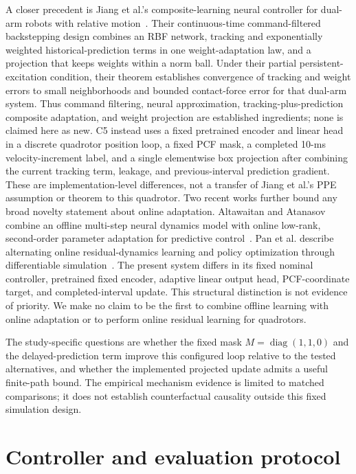 \documentclass[11pt]{article}
\begin{document}
A closer precedent is Jiang et al.'s composite-learning neural controller for dual-arm robots with relative motion~\cite{jiang2022composite}. Their continuous-time command-filtered backstepping design combines an RBF network, tracking and exponentially weighted historical-prediction terms in one weight-adaptation law, and a projection that keeps weights within a norm ball. Under their partial persistent-excitation condition, their theorem establishes convergence of tracking and weight errors to small neighborhoods and bounded contact-force error for that dual-arm system. Thus command filtering, neural approximation, tracking-plus-prediction composite adaptation, and weight projection are established ingredients; none is claimed here as new. C5 instead uses a fixed pretrained encoder and linear head in a discrete quadrotor position loop, a fixed PCF mask, a completed 10-ms velocity-increment label, and a single elementwise box projection after combining the current tracking term, leakage, and previous-interval prediction gradient. These are implementation-level differences, not a transfer of Jiang et al.'s PPE assumption or theorem to this quadrotor.
Two recent works further bound any broad novelty statement about online adaptation. Altawaitan and Atanasov combine an offline multi-step neural dynamics model with online low-rank, second-order parameter adaptation for predictive control~\cite{altawaitan2026adapting}. Pan et al. describe alternating online residual-dynamics learning and policy optimization through differentiable simulation~\cite{pan2026learningfly}. The present system differs in its fixed nominal controller, pretrained fixed encoder, adaptive linear output head, PCF-coordinate target, and completed-interval update. This structural distinction is not evidence of priority. We make no claim to be the first to combine offline learning with online adaptation or to perform online residual learning for quadrotors.

The study-specific questions are whether the fixed mask $M=\operatorname{diag}(1,1,0)$ and the delayed-prediction term improve this configured loop relative to the tested alternatives, and whether the implemented projected update admits a useful finite-path bound. The empirical mechanism evidence is limited to matched comparisons; it does not establish counterfactual causality outside this fixed simulation design.

\section{Controller and evaluation protocol}
\end{document}
